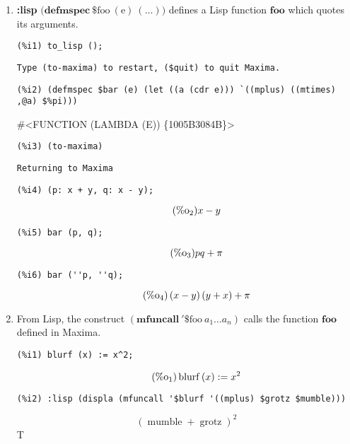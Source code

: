 \documentclass[12pt,leqno]{article}
\begin{document}
\begin{enumerate}
\item {\bf :lisp} $\mathrm{(}\mathbf{defmspec\ } \mathrm{\$foo\ (e)\ (\ldots))}$
defines a Lisp function $\mathbf{foo}$ which quotes its arguments.
\begin{verbatim}
(%i1) to_lisp ();
\end{verbatim}
\begin{Verbatim}
Type (to-maxima) to restart, ($quit) to quit Maxima.
\end{Verbatim}
\begin{verbatim}
(%i2) (defmspec $bar (e) (let ((a (cdr e))) `((mplus) ((mtimes) ,@a) $%pi)))
\end{verbatim}
\#\textless FUNCTION (LAMBDA (E)) \{1005B3084B\}\textgreater 
\begin{verbatim}
(%i3) (to-maxima)
\end{verbatim}
\begin{Verbatim}
Returning to Maxima
\end{Verbatim}
\begin{verbatim}
(%i4) (p: x + y, q: x - y);
\end{verbatim}
\begin{equation}
\tag{$\mathop{\mathrm{\%o}_{2}}$}x-y
\label{eq:doc-group1-code38-4-1}
\end{equation}
\begin{verbatim}
(%i5) bar (p, q);
\end{verbatim}
\begin{equation}
\tag{$\mathop{\mathrm{\%o}_{3}}$}p q+\pi
\label{eq:doc-group1-code38-5-1}
\end{equation}
\begin{verbatim}
(%i6) bar (''p, ''q);
\end{verbatim}
\begin{equation}
\tag{$\mathop{\mathrm{\%o}_{4}}$}\left(x-y\right) \left(y+x\right)+\pi
\label{eq:doc-group1-code38-6-1}
\end{equation}


\item From Lisp, the construct $(\mathbf{mfuncall\ '\$}\mathrm{foo\ }a_1 \ldots a_n)$
calls the function $\mathbf{foo}$ defined in Maxima.

\begin{verbatim}
(%i1) blurf (x) := x^2;
\end{verbatim}
\begin{equation}
\tag{$\mathop{\mathrm{\%o}_{1}}$}\mathop{\mathrm{blurf}}\left(x\right) := {x}^{2}
\label{eq:doc-group1-code39-1-1}
\end{equation}
\begin{verbatim}
(%i2) :lisp (displa (mfuncall '$blurf '((mplus) $grotz $mumble)))
\end{verbatim}
\begin{equation}
{\left(\mathop{\mathrm{mumble}}+\mathop{\mathrm{grotz}}\right)}^{2}
\label{eq:doc-group1-code39-2-1}
\end{equation}
T

\end{enumerate}
\end{document}
